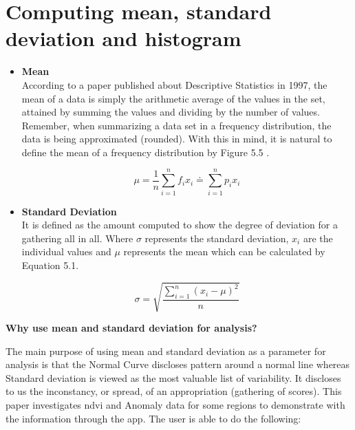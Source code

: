 \section{Computing mean, standard deviation and histogram}

\begin{itemize}
    \item \textbf{Mean} \\
    According to a paper published about Descriptive Statistics in 1997, the mean of a data is simply the arithmetic average of the values in the set, attained by summing the values and dividing by the number of values. Remember, when summarizing a data set in a frequency distribution, the data is being approximated (rounded). With this in mind, it is natural to define the mean of a frequency distribution by Figure 5.5 \cite{Mean_SD}.
    
    \begin{equation} \label{eq:mean_formula}
       \mu = \frac{1}{n} \sum\limits_{i=1}^{n}f_{i}x_{i} \doteq \sum\limits_{i=1}^{n}p_{i}x_{i}
    \end{equation}
    
    \item \textbf{Standard Deviation} \\
   It is defined as the amount computed to show the degree of deviation for a gathering all in all. Where $\sigma$ represents the standard deviation, $x_{i}$ are the individual values and $\mu$ represents the mean which can be calculated by Equation 5.1.
   
  \begin{equation} \label{eq:standarddeviation_formula}
      \sigma = \sqrt{\frac{\sum\limits_{i=1}^{n}(x_{i} - \mu)^2}{n}}
    \end{equation}
    


    
\end{itemize}

\centerline{\textbf{Why use mean and standard deviation for analysis?}}

The main purpose of using mean and standard deviation as a parameter for analysis is that the Normal Curve discloses pattern around a normal line whereas Standard deviation is viewed as the most valuable list of variability. It discloses to us the inconstancy, or spread, of an appropriation (gathering of scores). This paper investigates \gls{ndvi} and Anomaly data for some regions to demonstrate with the information through the app. The user is able to do the following:

